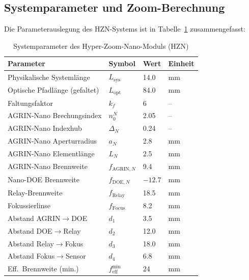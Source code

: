 ﻿\documentclass[12pt,a4paper]{article}
\theoremstyle{definition}
\newcommand{\eff}{\mathrm{eff}}
\newcommand{\AGRIN}{\mathrm{AGRIN}}
\newcommand{\DOE}{\mathrm{DOE}}
\begin{document}
	\subsection{Systemparameter und Zoom-Berechnung}

	Die Parameteraus\-legung des HZN-Systems ist in
	Tabelle~\ref{tab:hzn_params} zusammengefasst:

	\begin{table}[H]
		\centering
		\caption{Systemparameter des Hyper-Zoom-Nano-Moduls (HZN)}
		\label{tab:hzn_params}
		\begin{tabular}{llll}
			\toprule
			\textbf{Parameter} & \textbf{Symbol} & \textbf{Wert} & \textbf{Einheit}\\
			\midrule
			\rowcolor{blue!8}
			Physikalische Systeml\"ange   & $L_\mathrm{sys}$ & 14.0   & mm \\
			Optische Pfadl\"ange (gefaltet)& $L_\mathrm{opt}$& 84.0   & mm \\
			\rowcolor{blue!8}
			Faltungsfaktor                & $k_f$            & 6      & -- \\
			AGRIN-Nano Brechungsindex     & $n_0^N$          & 2.05   & -- \\
			\rowcolor{blue!8}
			AGRIN-Nano Indexhub           & $\Delta_N$       & 0.24   & -- \\
			AGRIN-Nano Aperturradius      & $a_N$            & 2.8    & mm \\
			\rowcolor{blue!8}
			AGRIN-Nano Elementl\"ange     & $L_N$            & 2.5    & mm \\
			AGRIN-Nano Brennweite         & $f_{\AGRIN,N}$   & 9.4    & mm \\
			\rowcolor{blue!8}
			Nano-DOE Brennweite           & $f_{\DOE,N}$     & $-12.7$& mm \\
			Relay-Brennweite              & $f_\mathrm{Relay}$& 18.5  & mm \\
			\rowcolor{blue!8}
			Fokussierlinse                & $f_\mathrm{Focus}$& 8.2   & mm \\
			Abstand AGRIN$\to$DOE         & $d_1$            & 3.5    & mm \\
			\rowcolor{blue!8}
			Abstand DOE$\to$Relay         & $d_2$            & 12.0   & mm \\
			Abstand Relay$\to$Fokus       & $d_3$            & 18.0   & mm \\
			\rowcolor{blue!8}
			Abstand Fokus$\to$Sensor      & $d_4$            & 6.8    & mm \\
			Eff.\ Brennweite (min.)       & $f_\eff^\mathrm{min}$ & 24 & mm \\

\end{tabular}
\end{table}
\end{document}

